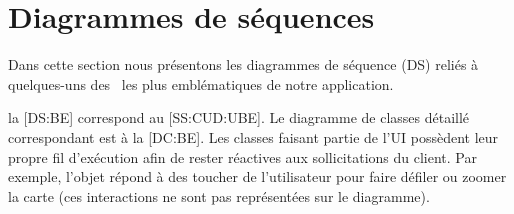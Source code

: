 \chapter{Diagrammes de séquences}

Dans cette section nous présentons les diagrammes de séquence (DS) reliés à quelques-uns des \cu\ les plus emblématiques de notre application.

\startitemize
\item la [DS:BE] correspond au \in{\cu}[SS:CUD:UBE].
Le diagramme de classes détaillé correspondant est à la [DC:BE].
Les classes faisant partie de l'UI possèdent leur propre fil d'exécution afin de rester réactives aux sollicitations du client.
Par exemple, l'objet  répond à des toucher de l'utilisateur pour faire défiler ou zoomer la carte (ces interactions ne sont pas représentées sur le diagramme). 
\stopitemize


